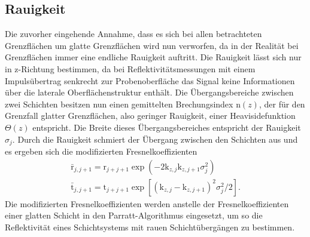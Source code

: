 \subsection{Rauigkeit}
\label{subsec:rauigkeit}
Die zuvorher eingehende
Annahme, dass es sich bei allen betrachteten
Grenzflächen um
glatte Grenzflächen wird nun verworfen, da in
der Realität bei Grenzflächen immer
eine endliche Rauigkeit auftritt.
Die Rauigkeit lässt sich nur in z-Richtung bestimmen,
da bei Reflektivitätsmessungen mit einem
Impulsübertrag senkrecht zur Probenoberfläche
das Signal
keine Informationen über die laterale Oberflächenstruktur
enthält. Die Übergangsbereiche zwischen
zwei Schichten besitzen
nun einen gemittelten Brechungsindex
$\mathrm{n}(z)$, der für den Grenzfall
glatter Grenzflächen, also geringer Rauigkeit,
einer Heavisidefunktion $\Theta(z)$ entspricht.
Die Breite dieses Übergangsbereiches
entspricht der Rauigkeit $\sigma_j$.
Durch die Rauigkeit schmiert der Übergang
zwischen den Schichten aus und es ergeben sich die
modifizierten Fresnelkoeffizienten
\begin{align}
\bar{\mathrm{r}}_{j,j+1} = \mathrm{r}_{j+j+1} \exp\left(-2\mathrm{k}_{z,j}\mathrm{k}_{z,j+1}\sigma^2_j\right)  \\
\bar{\mathrm{t}}_{j,j+1} = \mathrm{t}_{j+j+1} \exp\left[\left(\mathrm{k}_{z,j}-\mathrm{k}_{z,j+1}\right)^2\sigma^2_j/2\right].
\end{align}
Die modifizierten Fresnelkoeffizienten werden
anstelle der Fresnelkoeffizienten einer glatten
Schicht in den Parratt-Algorithmus eingesetzt,
um so die Reflektivität eines
Schichtsystems mit rauen Schichtübergängen
zu bestimmen.











\cite{sample}
